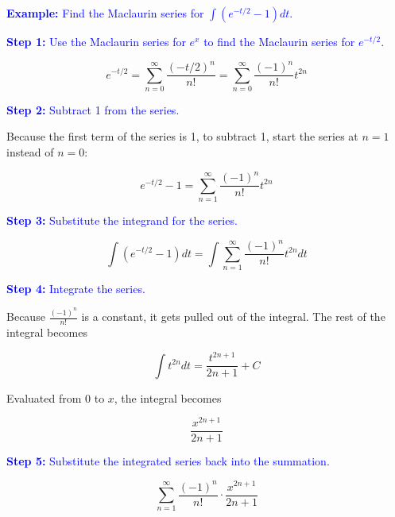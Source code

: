 \documentclass[letterpaper, 12pt]{article}
\newcommand{\example}[1]{\textcolor{blue}{\textbf{Example:} #1}}
\newcommand{\step}[2]{\textcolor{blue}{\textbf{Step #1:} #2}}
\begin{document}
\example{Find the Maclaurin series for $\displaystyle \int (e^{-t/2}-1) dt$.}

\step{1}{Use the Maclaurin series for $e^x$ to find the Maclaurin series for $e^{-t/2}$.}

$$e^{-t/2} = \sum_{n=0}^\infty \frac{(-t/2)^n}{n!} = \sum_{n=0}^\infty \frac{(-1)^n}{n!} t^{2n}$$

\step{2}{Subtract 1 from the series.}

Because the first term of the series is 1, to subtract 1, start the series at $n=1$ instead of $n=0$:

$$e^{-t/2} - 1 = \sum_{n=1}^\infty \frac{(-1)^n}{n!} t^{2n}$$

\step{3}{Substitute the integrand for the series.}

$$\int (e^{-t/2}-1) dt = \int \sum_{n=1}^\infty \frac{(-1)^n}{n!} t^{2n} dt$$

\step{4}{Integrate the series.}

Because $\displaystyle \frac{(-1)^n}{n!}$ is a constant, it gets pulled out of the integral. The rest of the integral becomes

$$\int t^{2n} dt = \frac{t^{2n+1}}{2n+1} + C$$

Evaluated from 0 to $x$, the integral becomes

$$\frac{x^{2n+1}}{2n+1}$$

\step{5}{Substitute the integrated series back into the summation.}

$$\boxed{\sum_{n=1}^\infty \frac{(-1)^n}{n!} \cdot \frac{x^{2n+1}}{2n+1}}$$
\end{document}
